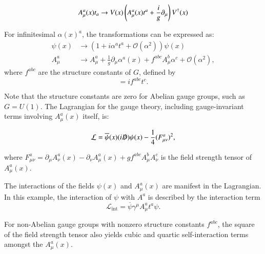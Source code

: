 \begin{equation}\label{eqn:gauge-field-transformation}
	A^a_{\mu}(x)t_a \rightarrow V(x) \left(A^a_{\mu}(x)t^a + \frac{i}{g} \partial_{\mu}\right) V^{\dagger}(x) \\
\end{equation}

For infinitesimal $\alpha(x)^a$, the transformations can be expressed as:
\begin{align}\label{eqn:gauge-field-transformation-infinitesimal}
	\psi(x)&\rightarrow (1 + i\alpha^a t^a + \mathcal{O}(\alpha^2))\psi(x) \\
	A^a_{\mu} &\rightarrow A_{\mu}^a + \frac{1}{g}\partial_{\mu}\alpha^a(x) + f^{abc}A^b_{\mu}\alpha^c + \mathcal{O}(\alpha^2),
\end{align}
where $f^{abc}$ are the structure constants of $G$, defined by
\begin{equation}
	[t^a,\ t^b] = if^{abc}t^c.
\end{equation}

Note that the structure constants are zero for Abelian gauge groups, such as $G=U(1)$. The Lagrangian for the gauge theory, including gauge-invariant terms involving $A^a_{\mu}(x)$ itself, is:

\begin{equation}\label{eqn:simple-gauge-lagrangian}
	\mathcal{L} = \overline{\psi}(x) (i\slashed{D}) \psi(x) - \frac{1}{4} (F^a_{\mu\nu})^2,
\end{equation}

where $F_{\mu\nu}^a=\partial_{\mu}A^a_{\nu}(x) - \partial_{\nu} A^a_{\mu}(x) + g f^{abc}A_{\mu}^b A_{\nu}^c$ is the field strength tensor of $A^a_{\mu}(x)$. 

The interactions of the fields $\psi(x)$ and $A^a_{\mu}(x)$ are manifest in the Lagrangian. In this example, the interaction of $\psi$ with $A^a$ is described by the interaction term
\begin{equation}
	\mathcal{L}_{\mathrm{int}} = \overline{\psi} \gamma^{\mu}A^a_{\mu}t^a \psi.
\end{equation}

For non-Abelian gauge groups with nonzero structure constants $f^{abc}$, the square of the field strength tensor also yields cubic and quartic self-interaction terms amongst the $A^a_{\mu}(x)$.



